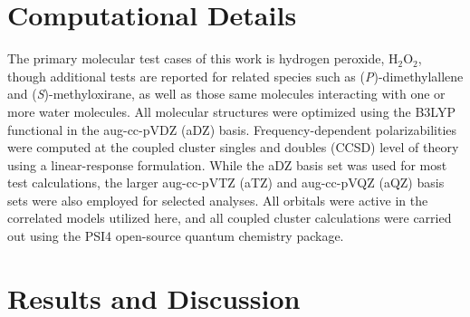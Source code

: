 \documentclass[11pt,article]{achemso}
\begin{document}
\section{Computational Details}

The primary molecular test cases of this work is hydrogen peroxide,
H$_2$O$_2$, though additional tests are reported for related species such as
(\textit{P})-dimethylallene and (\textit{S})-methyloxirane, as well as those
same molecules interacting with one or more water molecules.  All molecular
structures were optimized using the B3LYP
functional\cite{Becke93,Stephens94:B3LYP,Lee88:LYP} in the aug-cc-pVDZ (aDZ)
basis.\cite{Dunning89,Kendall92} Frequency-dependent polarizabilities were
computed at the coupled cluster singles and doubles (CCSD) level of
theory\cite{Purvis82} using a linear-response
formulation.\cite{Christiansen98} While the aDZ basis set was used for most
test calculations, the larger aug-cc-pVTZ (aTZ) and aug-cc-pVQZ (aQZ) basis
sets were also employed for selected analyses.\cite{Kendall92} All orbitals
were active in the correlated models utilized here, and all coupled cluster
calculations were carried out using the PSI4 open-source quantum chemistry
package.\cite{psi4}

\section{Results and Discussion}
\end{document}
